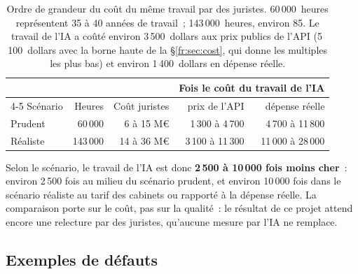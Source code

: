 \documentclass[11pt,a4paper]{article}
\begin{document}
\begin{table}[ht]
\centering
\small
\begin{tabular}{lrrrr}
\toprule
& & & \multicolumn{2}{c}{Fois le coût du travail de l'IA}\\
\cmidrule(lr){4-5}
Scénario & Heures & Coût juristes & prix de l'API & dépense réelle\\
\midrule
Prudent & 60\,000 & 6 à 15 M\euro{} & 1\,300 à 4\,700 & 4\,700 à 11\,800\\
Réaliste & 143\,000 & 14 à 36 M\euro{} & 3\,100 à 11\,300 & 11\,000 à 28\,000\\
\bottomrule
\end{tabular}
\caption{Ordre de grandeur du coût du même travail par des juristes. 60\,000~heures représentent 35 à 40 années de travail~; 143\,000~heures, environ 85. Le travail de l'IA a coûté environ 3\,500~dollars aux prix publics de l'API (5\,100~dollars avec la borne haute de la \S\ref{fr:sec:cost}, qui donne les multiples les plus bas) et environ 1\,400~dollars en dépense réelle.}
\label{fr:tab:lawyers}
\end{table}

Selon le scénario, le travail de l'IA est donc \textbf{2\,500 à 10\,000 fois moins cher}~: environ 2\,500 fois au milieu du scénario prudent, et environ 10\,000 fois dans le scénario réaliste au tarif des cabinets ou rapporté à la dépense réelle. La comparaison porte sur le coût, pas sur la qualité~: le résultat de ce projet attend encore une relecture par des juristes, qu'aucune mesure par l'IA ne remplace.

\subsection{Exemples de défauts}
\end{document}
